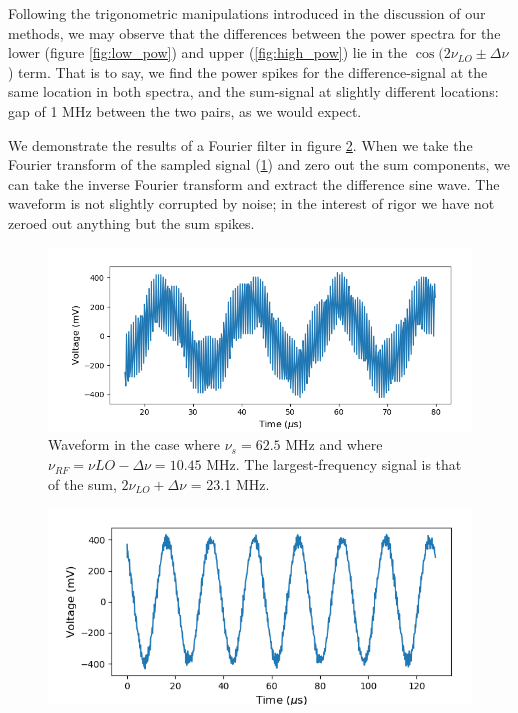 \documentclass[a4paper]{article}
\begin{document}
Following the trigonometric manipulations introduced in the discussion of our methods, we may observe that the differences between the power spectra for the lower (figure \ref{fig:low_pow}) and upper (\ref{fig:high_pow}) lie in the $\cos(2\nu_{LO} \pm \Delta \nu$) term. That is to say, we find the power spikes for the difference-signal at the same location in both spectra, and the sum-signal at slightly different locations: gap of 1 MHz between the two pairs, as we would expect.

We demonstrate the results of a Fourier filter in figure \ref{fig:filtered}. When we take the Fourier transform of the sampled signal (\ref{fig:low_display}) and zero out the sum components, we can take the inverse Fourier transform and extract the difference sine wave. The waveform is not slightly corrupted by noise; in the interest of rigor we have not zeroed out anything but the sum spikes.

\begin{figure}
\centering
\includegraphics[width=.8\linewidth]{7-1/low_osc}
\caption{Waveform in the case where $\nu_s = 62.5$ MHz and where $\nu_{RF} = \nu{LO} - \Delta \nu = 10.45$ MHz. The largest-frequency signal is that of the sum, $2 \nu_{LO} + \Delta \nu$ = 23.1 MHz.}
\label{fig:low_display}
\end{figure}

\begin{figure}
\centering
\includegraphics[width=.8\linewidth]{7-1/filtered}
\caption{}
\label{fig:filtered}
\end{figure}
\end{document}
